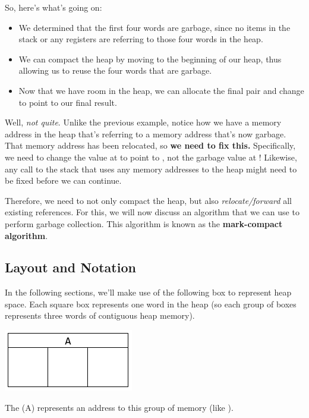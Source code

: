 So, here's what's going on: 
\begin{itemize}
    \item We determined that the first four words are garbage, since no items in the stack or any registers are referring to those four words in the heap. 
    \item We can compact the heap by moving  to the beginning of our heap, thus allowing us to reuse the four words that are garbage. 
    \item Now that we have room in the heap, we can allocate the final pair and change  to point to our final result.
\end{itemize}
Well, \emph{not quite}. Unlike the previous example, notice how we have a memory address in the heap that's referring to a memory address that's now garbage. That memory address has been relocated, so \textbf{we need to fix this.} Specifically, we need to change the value at  to point to , not the garbage value at ! Likewise, any call to the stack that uses any memory addresses to the heap might need to be fixed before we can continue. 

\bigskip 

Therefore, we need to not only compact the heap, but also \emph{relocate/forward} all existing references. For this, we will now discuss an algorithm that we can use to perform garbage collection. This algorithm is known as the \textbf{mark-compact algorithm}.

\subsection{Layout and Notation}
In the following sections, we'll make use of the following box to represent heap space. Each square box represents one word in the heap (so each group of boxes represents three words of contiguous heap memory).
\begin{center}
    \includegraphics[scale=0.7]{assets/GCAlgLayout.png}
\end{center}
The (A) represents an address to this group of memory (like ).

\bigskip 

